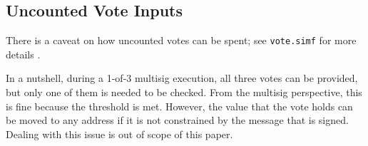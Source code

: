\documentclass[11pt]{article}
\begin{document}
    \subsection{Uncounted Vote Inputs}
    \label{app:uncounted}

    There is a caveat on how uncounted votes can be spent; see \texttt{vote.simf} for more details \cite{native-multisig-vote}.

    In a nutshell, during a 1-of-3 multisig execution, all three votes can be provided, but only one of them is needed to be checked. From the multisig perspective, this is fine because the threshold is met. However, the value that the vote holds can be moved to any address if it is not constrained by the message that is signed. Dealing with this issue is out of scope of this paper.

    
    
\end{document}

